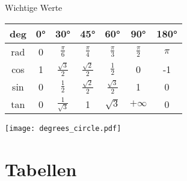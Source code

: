 \documentclass[a4paper,10pt]{article}
\begin{document}
\begin{mainbox}{Wichtige Werte}
\begin{center} 
 \begin{tabular}{c|cccccc}
  deg & 0° & 30° & 45° & 60° & 90° & 180° \\
  \midrule
  rad & 0 & $\frac{\pi}{6}$ & $\frac{\pi}{4}$ & $\frac{\pi}{3}$ & $\frac{\pi}{2}$ & $\pi$ \\
  cos & 1 & $\frac{\sqrt{3}}{2}$ & $\frac{\sqrt{2}}{2}$ & $\frac{1}{2}$ & 0 & -1 \\
  sin & 0 & $\frac{1}{2}$ & $\frac{\sqrt{2}}{2}$ & $\frac{\sqrt{3}}{2}$ & 1 & 0 \\
  tan & 0 & $\frac{1}{\sqrt{3}}$ & 1 & $\sqrt{3}$ & $+\infty$ & 0 \\
 \end{tabular}
\end{center}
\end{mainbox}

\begin{center}
\texttt{[image: degrees\_circle.pdf]}
  
\end{center}

\section{Tabellen}
\end{document}
